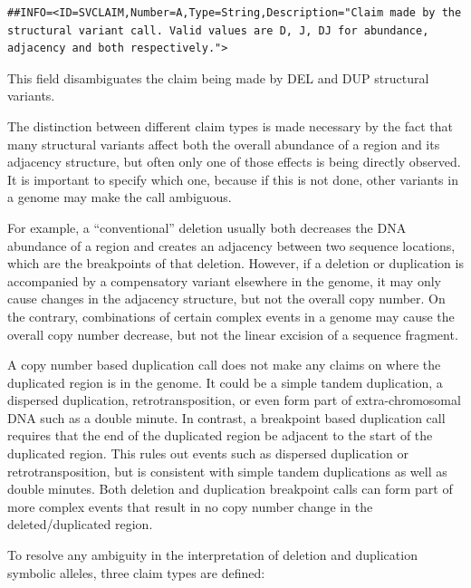 \documentclass[8pt]{article}
\begin{document}
\footnotesize
\begin{verbatim}
##INFO=<ID=SVCLAIM,Number=A,Type=String,Description="Claim made by the structural variant call. Valid values are D, J, DJ for abundance, adjacency and both respectively.">
\end{verbatim}
\normalsize

This field disambiguates the claim being made by DEL and DUP structural variants.

The distinction between different claim types is made necessary by the fact that many structural variants affect both the overall abundance of a region and its adjacency structure, but often only one of those effects is being directly observed.
It is important to specify which one, because if this is not done, other variants in a genome may make the call ambiguous.

For example, a ``conventional'' deletion usually both decreases the DNA abundance of a region and creates an adjacency between two sequence locations, which are the breakpoints of that deletion.
However, if a deletion or duplication is accompanied by a compensatory variant elsewhere in the genome, it may only cause changes in the adjacency structure, but not the overall copy number.
On the contrary, combinations of certain complex events in a genome may cause the overall copy number decrease, but not the linear excision of a sequence fragment.

A copy number based duplication call does not make any claims on where the duplicated region is in the genome.
It could be a simple tandem duplication, a dispersed duplication, retrotransposition, or even form part of extra-chromosomal DNA such as a double minute.
In contrast, a breakpoint based duplication call requires that the end of the duplicated region be adjacent to the start of the duplicated region.
This rules out events such as dispersed duplication or retrotransposition, but is consistent with simple tandem duplications as well as double minutes.
Both deletion and duplication breakpoint calls can form part of more complex events that result in no copy number change in the deleted/duplicated region.

To resolve any ambiguity in the interpretation of deletion and duplication symbolic alleles, three claim types are defined:
\end{document}
